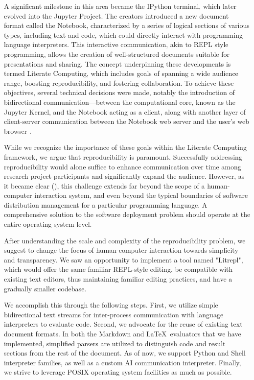 \documentclass[a4paper,12pt,twocolumn]{article}
\newcommand{\Latex}{\LaTeX\ }
\begin{document}
A significant milestone in this area became the IPython terminal, which later
evolved into the Jupyter Project. The creators introduced a new document format
called the Notebook, characterized by a series of logical sections of various
types, including text and code, which could directly interact with programming
language interpreters. This interactive communication, akin to REPL style
programming, allows the creation of well-structured documents suitable for
presentations and sharing. The concept underpinning these developments is termed
Literate Computing, which includes goals of spanning a wide audience range,
boosting reproducibility, and fostering collaboration. To achieve these
objectives, several technical decisions were made, notably the introduction of
bidirectional communication—between the computational core, known as the Jupyter
Kernel, and the Notebook acting as a client, along with another layer of
client-server communication between the Notebook web server and the user’s web
browser \cite{Perez2007IPython, Granger2021litcomp, Kluyver2016jupnb}.

While we recognize the importance of these goals within the Literate Computing
framework, we argue that reproducibility is paramount. Successfully addressing
reproducibility would alone suffice to enhance communication over time among
research project participants and significantly expand the audience.  However,
as it became clear (\cite{Dolstra2010, Vallet2022}), this challenge extends far
beyond the scope of a human-computer interaction system, and even beyond the
typical boundaries of software distribution management for a particular
programming language. A comprehensive solution to the software deployment
problem should operate at the entire operating system level.

After understanding the scale and complexity of the reproducibility problem, we
suggest to change the focus of human-computer interaction towards simplicity and
transparency. We saw an opportunity to implement a tool named "Litrepl", which
would offer the same familiar REPL-style editing, be compatible with existing
text editors, thus maintaining familiar editing practices, and have a gradually
smaller codebase.

We accomplish this through the following steps. First, we utilize simple
bidirectional text streams for inter-process communication with language
interpreters to evaluate code. Second, we advocate for the reuse of existing
text document formats. In both the Markdown and \Latex evaluators that we have
implemented, simplified parsers are utilized to distinguish code and result
sections from the rest of the document. As of now, we support Python and Shell
interpreter families, as well as a custom AI communication interpreter. Finally,
we strive to leverage POSIX \cite{POSIX2024} operating system facilities as much
as possible.
\end{document}
